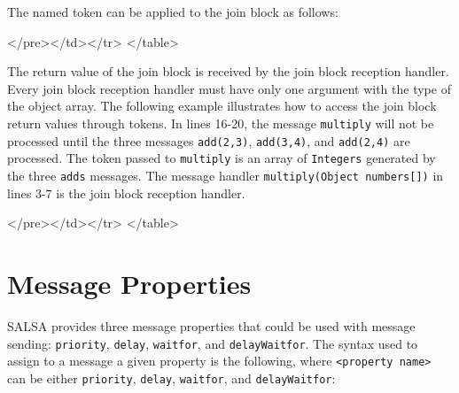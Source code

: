 The named token can be applied to the join block as follows:
{\singlespace

}
\begin{htmlonly}

 \begin{rawhtml} 
   </pre></td></tr>
  </table>
\end{rawhtml} 
\end{htmlonly}

The return value of the join block is received by 
the join block reception handler. Every join block reception handler
must have only one argument with the type of the object array. 
The following example illustrates how to access the join block return 
values through tokens.  
In lines 16-20, the message {\tt multiply} will not be processed 
until the three messages {\tt add(2,3)}, {\tt add(3,4)}, and {\tt add(2,4)} 
are processed. The token passed to {\tt multiply} is an 
array of {\tt Integers} generated by the three {\tt adds} messages. 
The message handler {\tt multiply(Object numbers[])} in lines 3-7 
is the join block reception handler.
{\singlespace

}
\begin{htmlonly}

 \begin{rawhtml} 
   </pre></td></tr>
  </table>
\end{rawhtml} 
\end{htmlonly}

\section{Message Properties}

SALSA provides three message properties that could 
be used with message sending: {\tt priority}, {\tt delay}, 
{\tt waitfor}, and {\tt delayWaitfor}. The syntax used to assign to a message a 
given property is the following, where 
{\tt {\textless}property name{\textgreater}} can be either {\tt priority}, 
{\tt delay}, {\tt waitfor}, and {\tt delayWaitfor}:

